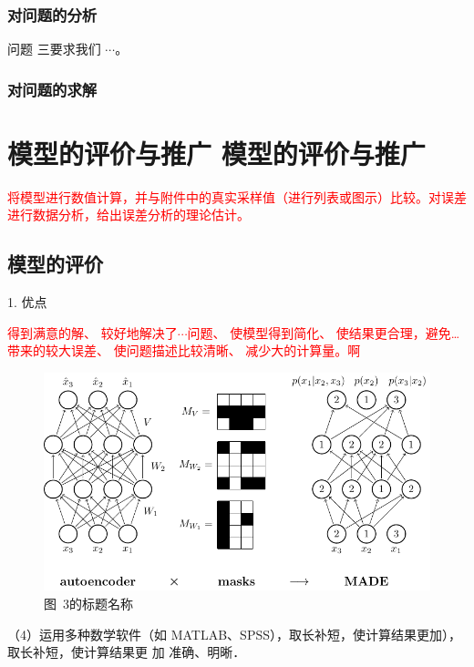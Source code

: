 \documentclass[12pt,a4paper]{mcmthesis}
\begin{document}
    \subsubsection{对问题的分析}

    问题 三要求我们 $\cdots$。

    \subsubsection{对问题的求解}


    \section{模型的评价与推广 模型的评价与推广}

    \textcolor{red}{将模型进行数值计算，并与附件中的真实采样值（进行列表或图示）比较。对误差进行数据分析，给出误差分析的理论估计。}

    \subsection{模型的评价}


    1. 优点

    \textcolor{red}{得到满意的解、
    较好地解决了$\cdots$问题、
    使模型得到简化、
    使结果更合理，避免…带来的较大误差、
    使问题描述比较清晰、
    减少大的计算量。啊}



    \begin{figure}[h!t]
        \centerline{\includegraphics[scale=0.8]{figures/fig4}}
        \caption{\song\wuhao 图~3的标题名称}
    \end{figure}


    （4）运用多种数学软件（如 MATLAB、SPSS），取长补短，使计算结果更加），取长补短，使计算结果更
    加 准确、明晰．
\end{document}

